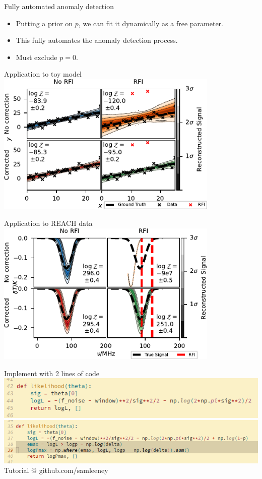 \documentclass[aspectratio=169]{beamer}
\begin{document}
  \begin{frame}{Fully automated anomaly detection}
    \begin{itemize}
    \item Putting a prior on $p$, we can fit it dynamically as a free parameter.
    \item This fully automates the anomaly detection process.
    \item Must exclude $p=0$.
    \end{itemize}
\end{frame}

\begin{frame}{Application to toy model}
    \centering
    \includegraphics[width=0.8\textwidth]{images/4pane_toy_sidebar.pdf}
\end{frame}

\begin{frame}{Application to REACH data}
    \centering
    \includegraphics[width=0.8\textwidth]{images/4pane_reach_sidebar.pdf}
\end{frame}

\begin{frame}{Implement with 2 lines of code}
    \includegraphics[width=1\textwidth]{images/logl1.png}
    \includegraphics[width=1\textwidth]{images/logl2.png}
    \centering Tutorial @ github.com/samleeney
\end{frame}
\end{document}
